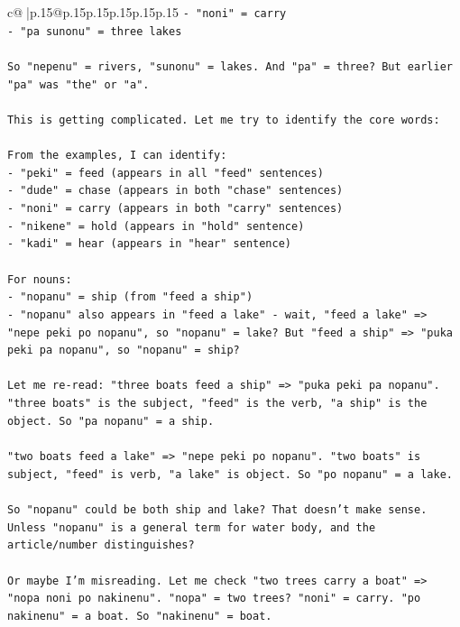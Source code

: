\documentclass{article}
\begin{document}
{\begin{supertabular}{c@{$\;$}|p{.15\linewidth}@{}p{.15\linewidth}p{.15\linewidth}p{.15\linewidth}p{.15\linewidth}p{.15\linewidth}}
{{{\texttt{{-} "noni" = carry} \\
\texttt{{-} "pa sunonu" = three lakes} \\
\\ 
\texttt{So "nepenu" = rivers, "sunonu" = lakes. And "pa" = three? But earlier "pa" was "the" or "a".} \\
\\ 
\texttt{This is getting complicated. Let me try to identify the core words:} \\
\\ 
\texttt{From the examples, I can identify:} \\
\texttt{{-} "peki" = feed (appears in all "feed" sentences)} \\
\texttt{{-} "dude" = chase (appears in both "chase" sentences)} \\
\texttt{{-} "noni" = carry (appears in both "carry" sentences)} \\
\texttt{{-} "nikene" = hold (appears in "hold" sentence)} \\
\texttt{{-} "kadi" = hear (appears in "hear" sentence)} \\
\\ 
\texttt{For nouns:} \\
\texttt{{-} "nopanu" = ship (from "feed a ship")} \\
\texttt{{-} "nopanu" also appears in "feed a lake" {-} wait, "feed a lake" => "nepe peki po nopanu", so "nopanu" = lake? But "feed a ship" => "puka peki pa nopanu", so "nopanu" = ship?} \\
\\ 
\texttt{Let me re{-}read: "three boats feed a ship" => "puka peki pa nopanu". "three boats" is the subject, "feed" is the verb, "a ship" is the object. So "pa nopanu" = a ship.} \\
\\ 
\texttt{"two boats feed a lake" => "nepe peki po nopanu". "two boats" is subject, "feed" is verb, "a lake" is object. So "po nopanu" = a lake.} \\
\\ 
\texttt{So "nopanu" could be both ship and lake? That doesn't make sense. Unless "nopanu" is a general term for water body, and the article/number distinguishes?} \\
\\ 
\texttt{Or maybe I'm misreading. Let me check "two trees carry a boat" => "nopa noni po nakinenu". "nopa" = two trees? "noni" = carry. "po nakinenu" = a boat. So "nakinenu" = boat.} \\
\\ 
}}}
\end{supertabular}}
\end{document}
